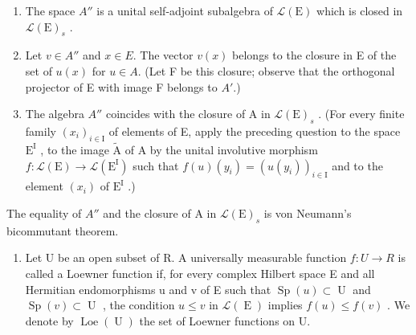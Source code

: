 \begin{enumerate}
\def\labelenumi{\alph{enumi})}
\item
  The space \(A''\) is a unital self-adjoint subalgebra of \(\mathcal{L}(\mathrm{E})\) which is closed in \(\mathcal{L}(\mathrm{E})_s\) .
\item
  Let \(v \in A''\) and \(x \in E\). The vector \(v(x)\) belongs to the closure in E of the set of \(u(x)\) for \(u \in A\). (Let F be this closure; observe that the orthogonal projector of E with image F belongs to \(A'\).)
\item
  The algebra \(A''\) coincides with the closure of A in \(\mathcal{L}(\mathrm{E})_s\) . (For every finite family \((x_i)_{i \in \mathrm{I}}\) of elements of E, apply the preceding question to the space \(\mathrm{E}^{\mathrm{I}}\) , to the image \(\widetilde{\mathrm{A}}\) of A by the unital involutive morphism \(f: \mathcal{L}(\mathrm{E}) \to \mathcal{L}(\mathrm{E}^{\mathrm{I}})\) such that \(f(u)(y_i) = (u(y_i))_{i \in \mathrm{I}}\) and to the element \((x_i)\) of \(\mathrm{E}^{\mathrm{I}}\) .)
\end{enumerate}

The equality of \(A''\) and the closure of A in \(\mathcal{L}(\mathrm{E})_s\) is von Neumann's bicommutant theorem.

\begin{enumerate}
\def\labelenumi{\arabic{enumi})}
\setcounter{enumi}{24}
\tightlist
\item
  Let U be an open subset of R. A universally measurable function \(f: U \to R\) is called a Loewner function if, for every complex Hilbert space E and all Hermitian endomorphisms u and v of E such that \(\operatorname{Sp}(u) \subset \operatorname{U}\) and \(\operatorname{Sp}(v) \subset \operatorname{U}\) , the condition \(u \leqslant v\) in \(\mathcal{L}(\operatorname{E})\) implies \(f(u) \leqslant f(v)\) . We denote by \(\operatorname{Loe}(\operatorname{U})\) the set of Loewner functions on U.
\end{enumerate}

